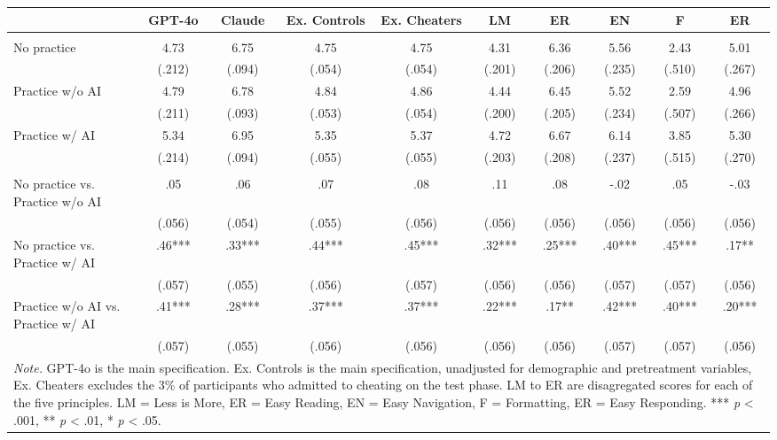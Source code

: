 \documentclass[11pt]{report}
\begin{document}
\begin{append}
\begin{table}[ht]
\begin{tabular}{lccccccccc}
\toprule
  & GPT-4o & Claude & Ex. Controls & Ex. Cheaters & LM & ER & EN & F & ER \\ 
\midrule\addlinespace[2.5pt]
\multicolumn{10}{l}{\textbf{Means --- (SE)}} \\ 
\midrule\addlinespace[2.5pt]
No practice & 4.73 & 6.75 & 4.75 & 4.75 & 4.31 & 6.36 & 5.56 & 2.43 & 5.01 \\ 
 & (.212) & (.094) & (.054) & (.054) & (.201) & (.206) & (.235) & (.510) & (.267) \\ 
Practice w/o AI & 4.79 & 6.78 & 4.84 & 4.86 & 4.44 & 6.45 & 5.52 & 2.59 & 4.96 \\ 
 & (.211) & (.093) & (.053) & (.054) & (.200) & (.205) & (.234) & (.507) & (.266) \\ 
Practice w/ AI & 5.34 & 6.95 & 5.35 & 5.37 & 4.72 & 6.67 & 6.14 & 3.85 & 5.30 \\ 
 & (.214) & (.094) & (.055) & (.055) & (.203) & (.208) & (.237) & (.515) & (.270) \\ 
\midrule\addlinespace[2.5pt]
\multicolumn{10}{l}{\textbf{Effect Sizes (d) --- (SE)}} \\ 
\midrule\addlinespace[2.5pt]
No practice vs. Practice w/o AI & .05 & .06 & .07 & .08 & .11 & .08 & -.02 & .05 & -.03 \\ 
 & (.056) & (.054) & (.055) & (.056) & (.056) & (.056) & (.056) & (.056) & (.056) \\ 
No practice vs. Practice w/ AI & .46*** & .33*** & .44*** & .45*** & .32*** & .25*** & .40*** & .45*** & .17** \\ 
 & (.057) & (.055) & (.056) & (.057) & (.056) & (.056) & (.057) & (.057) & (.056) \\ 
Practice w/o AI vs. Practice w/ AI & .41*** & .28*** & .37*** & .37*** & .22*** & .17** & .42*** & .40*** & .20*** \\ 
 & (.057) & (.055) & (.056) & (.056) & (.056) & (.056) & (.057) & (.057) & (.056) \\ 
\midrule
\multicolumn{10}{p{15cm}}{\textit{Note.} GPT-4o is the main specification. Ex. Controls is the main specification, unadjusted for demographic and pretreatment variables, Ex. Cheaters excludes the 3\% of participants who admitted to cheating on the test phase. LM to ER are disagregated scores for each of the five principles. LM = Less is More, ER = Easy Reading, EN = Easy Navigation, F = Formatting, ER = Easy Responding. *** \textit{p} < .001, ** \textit{p} < .01, * \textit{p} < .05.}
\vspace{5pt}
\end{tabular}
    \label{tab:s2_followup}
\end{table}


\end{append}
\end{document}
